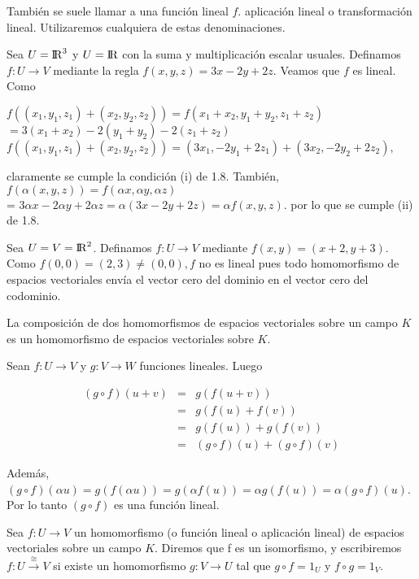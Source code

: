 				También se suele llamar a una función lineal $ f $. aplicación lineal o transformación lineal. Utilizaremos cualquiera de estas denominaciones.
				
				
				\begin{ejem} Sea $ U = {\rm I\!R}^{3} $ y $ U = {\rm I\!R} $ con la suma y multiplicación escalar usuales. Definamos $ f:U \rightarrow V $  mediante la regla $ f(x, y, z) = 3x - 2y + 2z $. Veamos que $ f $ es lineal. Como
				
			$f((x_{1}, y_{1}, z_{1})+(x_{2}, y_{2}, z_{2})) =  f(x_{1}+x_{2}, y_{1}+y_{2}, z_{1}+z_{2}) $ $= 3(x_{1}+x_{2}) -2(y_{1}+y_{2}) -2(z_{1}+z_{2})$
			$f((x_{1}, y_{1}, z_{1})+(x_{2}, y_{2}, z_{2}))  =  (3x_{1}, -2y_{1}+2z_{1})+(3x_{2}, -2y_{2}+2z_{2}),$
				
				\setlength{\parindent}{0in}%
				claramente se cumple la condición (i) de 1.8. También, $ f(\alpha(x, y, z)) = f(\alpha x, \alpha y, \alpha z)$\\
				= $ 3 \alpha x -2 \alpha y +2 \alpha z = \alpha(3x-2y+2z) = \alpha f(x,y,z)$. por lo que se cumple (ii) de 1.8. 
				\end{ejem}
				\begin{ejem} Sea $ U = V = {\rm I\!R}^{2} $. Definamos $ f:U \rightarrow V $ mediante $ f(x,y) = (x+2, y+3) $. Como $ f(0,0) = (2,3) \not= (0,0), f$ no es lineal pues todo homomorfismo de espacios vectoriales envía el vector cero del dominio en el vector cero del codominio. \end{ejem}
				
				\begin{pro}
					La composición de dos homomorfismos de espacios vectoriales sobre un campo $ K $ es un homomorfismo de espacios vectoriales sobre $ K $.
				\end{pro}
				
				\begin{demo}
					Sean $ f:U \rightarrow V  $ y $ g:V \rightarrow W $ funciones lineales. Luego
					
					\[ \begin{matrix}
					(g \circ f) (u+v) &=& g(f(u+v))\\
					&=& g(f(u)+f(v))\\
					&=& g(f(u))+g(f(v))\\
					&=& (g \circ f) (u)+(g \circ f) (v)
					\end{matrix} \] 
				\end{demo}
				Además, $ (g \circ f) (\alpha u) = g(f(\alpha u)) = g(\alpha f(u)) = \alpha g(f(u)) = \alpha (g \circ f)(u) $. Por lo tanto $ (g \circ f) $ es una función lineal.
				\begin{defi}
				Sea $ f:U \rightarrow V$ un homomorfismo (o función lineal o aplicación lineal) de espacios vectoriales sobre un campo $ K $. Diremos que f es un isomorfismo, y escribiremos $ f:U \overset{\cong}{\rightarrow} V$ si existe un homomorfismo $ g:V \rightarrow U $ tal que $ g \circ f = 1_{U} $ y $ f \circ g = 1_{V}$.
				\end{defi}
				
